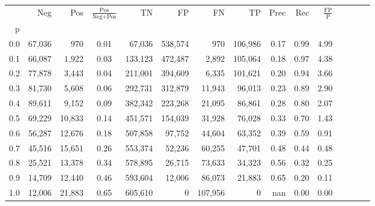 \begin{tabular}{rrrcrrrrrrrrrrr}
\toprule
{} &     Neg &     Pos & $\frac{\text{Pos}}{\text{Neg}+\text{Pos}}$ &       TN &       FP &       FN &       TP &  Prec &   Rec & $\frac{\text{FP}}{\text{P}}$ \\
p   &         &         &                                            &          &          &          &          &       &       &                              \\
\midrule
0.0 &  67,036 &     970 &                                       0.01 &   67,036 &  538,574 &      970 &  106,986 &  0.17 &  0.99 &                         4.99 \\
0.1 &  66,087 &   1,922 &                                       0.03 &  133,123 &  472,487 &    2,892 &  105,064 &  0.18 &  0.97 &                         4.38 \\
0.2 &  77,878 &   3,443 &                                       0.04 &  211,001 &  394,609 &    6,335 &  101,621 &  0.20 &  0.94 &                         3.66 \\
0.3 &  81,730 &   5,608 &                                       0.06 &  292,731 &  312,879 &   11,943 &   96,013 &  0.23 &  0.89 &                         2.90 \\
0.4 &  89,611 &   9,152 &                                       0.09 &  382,342 &  223,268 &   21,095 &   86,861 &  0.28 &  0.80 &                         2.07 \\
0.5 &  69,229 &  10,833 &                                       0.14 &  451,571 &  154,039 &   31,928 &   76,028 &  0.33 &  0.70 &                         1.43 \\
0.6 &  56,287 &  12,676 &                                       0.18 &  507,858 &   97,752 &   44,604 &   63,352 &  0.39 &  0.59 &                         0.91 \\
0.7 &  45,516 &  15,651 &                                       0.26 &  553,374 &   52,236 &   60,255 &   47,701 &  0.48 &  0.44 &                         0.48 \\
0.8 &  25,521 &  13,378 &                                       0.34 &  578,895 &   26,715 &   73,633 &   34,323 &  0.56 &  0.32 &                         0.25 \\
0.9 &  14,709 &  12,440 &                                       0.46 &  593,604 &   12,006 &   86,073 &   21,883 &  0.65 &  0.20 &                         0.11 \\
1.0 &  12,006 &  21,883 &                                       0.65 &  605,610 &        0 &  107,956 &        0 &   nan &  0.00 &                         0.00 \\
\bottomrule
\end{tabular}
